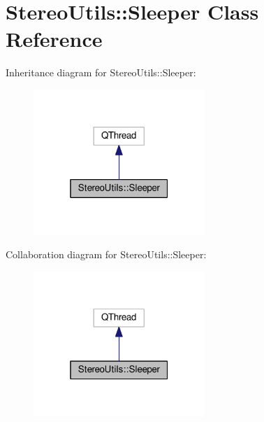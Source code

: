 \hypertarget{class_stereo_utils_1_1_sleeper}{}\section{Stereo\+Utils\+:\+:Sleeper Class Reference}
\label{class_stereo_utils_1_1_sleeper}


Inheritance diagram for Stereo\+Utils\+:\+:Sleeper\+:
\nopagebreak
\begin{figure}[H]
\begin{center}
\leavevmode
\includegraphics[width=184pt]{class_stereo_utils_1_1_sleeper__inherit__graph}
\end{center}
\end{figure}


Collaboration diagram for Stereo\+Utils\+:\+:Sleeper\+:
\nopagebreak
\begin{figure}[H]
\begin{center}
\leavevmode
\includegraphics[width=184pt]{class_stereo_utils_1_1_sleeper__coll__graph}
\end{center}
\end{figure}
